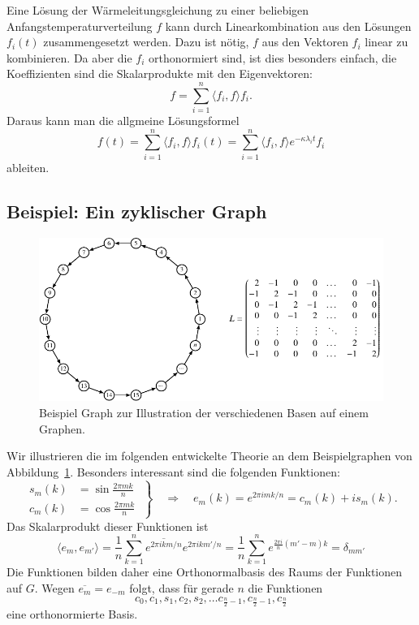 Eine Lösung der Wärmeleitungsgleichung zu einer beliebigen
Anfangstemperaturverteilung $f$ kann durch Linearkombination aus 
den Lösungen $f_i(t)$ zusammengesetzt werden.
Dazu ist nötig, $f$ aus den Vektoren $f_i$ linear zu kombinieren.
Da aber die $f_i$ orthonormiert sind, ist dies besonders einfach,
die Koeffizienten sind die Skalarprodukte mit den Eigenvektoren:
\[
f=\sum_{i=1}^n \langle f_i,f\rangle f_i.
\]
Daraus kann man die allgmeine Lösungsformel
\begin{equation}
f(t)
=
\sum_{i=1}^n \langle f_i,f\rangle f_i(t)
=
\sum_{i=1}^n \langle f_i,f\rangle e^{-\kappa\lambda_i t}f_i
\label{buch:graphen:eqn:eigloesung}
\end{equation}
ableiten.

\subsection{Beispiel: Ein zyklischer Graph}
\begin{figure}
\centering
\includegraphics{chapters/70-graphen/images/kreis.pdf}
\caption{Beispiel Graph zur Illustration der verschiedenen Basen auf einem
Graphen.
\label{buch:graphen:fig:kreis}}
\end{figure}
Wir illustrieren die im folgenden entwickelte Theorie an dem Beispielgraphen
von Abbildung~\ref{buch:graphen:fig:kreis}.
Besonders interessant sind die folgenden Funktionen:
\[
\left.
\begin{aligned}
s_m(k)
&=
\sin\frac{2\pi mk}{n}
\\
c_m(k)
&=
\cos\frac{2\pi mk}{n}
\end{aligned}
\;
\right\}
\quad
\Rightarrow
\quad
e_m(k)
=
e^{2\pi imk/n}
=
c_m(k) + is_m(k).
\]
Das Skalarprodukt dieser Funktionen ist
\[
\langle e_m, e_{m'}\rangle
=
\frac1n
\sum_{k=1}^n
\overline{e^{2\pi i km/n}}
e^{2\pi ikm'/n}
=
\frac1n
\sum_{k=1}^n
e^{\frac{2\pi i}{n}(m'-m)k}
=
\delta_{mm'}
\]
Die Funktionen bilden daher eine Orthonormalbasis des Raums der
Funktionen auf $G$.
Wegen $\overline{e_m} = e_{-m}$ folgt, dass für gerade $n$
die Funktionen
\[
c_0, c_1,s_1,c_2,s_2,\dots c_{\frac{n}2-1},c_{\frac{n}2-1},c_{\frac{n}2}
\]
eine orthonormierte Basis.


